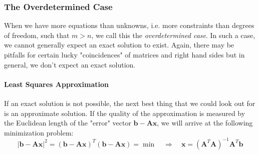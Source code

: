 \subsubsection{The Overdetermined Case}
When we have more equations than unknowns, i.e. more constraints than degrees of freedom, such that $m > n$, we call this the \emph{overdetermined case}. In such a case, we cannot generally expect an exact solution to exist. Again, there may be pitfalls for certain lucky "coincidences" of matrices and right hand sides but in general, we don't expect an exact solution.

\paragraph{Least Squares Approximation}
If an exact solution is not possible, the next best thing that we could look out for is an approximate solution. If the quality of the approximation is measured by the Euclidean length of the "error" vector $\mathbf{b} - \mathbf{A x}$, we will arrive at the following minimization problem:
\begin{equation}
|\mathbf{b} - \mathbf{A x}|^2 = (\mathbf{b} - \mathbf{A x})^T (\mathbf{b} - \mathbf{A x}) = \min
\quad \Rightarrow \quad
\boxed{ \mathbf{x} = (\mathbf{A}^T \mathbf{A})^{-1} \mathbf{A}^T \mathbf{b} }
\end{equation}






